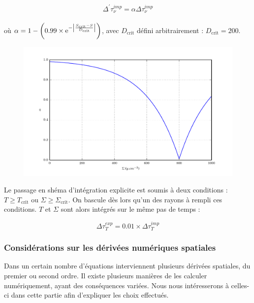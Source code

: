 \begin{equation}
	\Delta^{'} \tau_{\nu}^{imp} = \alpha \Delta \tau_{\nu}^{imp}
\end{equation} \\

où $\alpha = 1 - \left( 0.99 \times \e^{- \left| \frac{S_\textrm{crit} - S}{D_\textrm{crit}} \right|} \right)$, avec $D_\textrm{crit}$ défini arbitrairement : $D_\textrm{crit} = 200$.


\begin{figure}
  \includegraphics{figures/alpha_fonction_de_sigma.pdf}
  \caption{}
\end{figure}

Le passage en shéma d'intégration explicite est soumis à deux conditions : $T
\ge T_\textrm{crit}$ ou $\Sigma \ge \Sigma_\textrm{crit}$. On bascule dès lors
qu'un des rayons à rempli ces conditions. $T$ et $\Sigma$ sont alors intégrés
sur le même pas de temps :

\begin{equation}
\Delta \tau_{T}^{exp} = 0.01 \times \Delta \tau_{T}^{imp}
\end{equation}

\subsubsection{Considérations sur les dérivées numériques spatiales}

Dans un certain nombre d’équations interviennent plusieurs dérivées spatiales,
du premier ou second ordre. Il existe plusieurs manières de les calculer
numériquement, ayant des conséquences variées. Nous nous intéresserons à
celles-ci dans cette partie afin d’expliquer les choix effectués.

